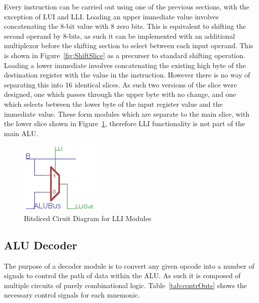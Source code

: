 Every instruction can be carried out using one of the previous sections, with the exception of LUI and LLI. Loading an upper immediate value involves concatenating the 8-bit value with 8 zero bits. 
This is equivalent to shifting the second operand by 8-bits, as such it can be implemented with an additional multiplexor before the shifting section to select between each input operand. 
This is shown in Figure~\ref{fig:ShiftSlice} as a precurser to standard shifting operation. 
Loading a lower immediate involves concatenating the existing high byte of the destination register with the value in the instruction. 
However there is no way of separating this into 16 identical slices. 
As such two versions of the slice were designed, one which passes through the upper byte with no change, and one which selects between the lower byte of the input register value and the immediate value. 
These form modules which are separate to the main slice, with the lower slice shown in  Figure~\ref{fig:LLISlice}, therefore LLI functionality is not part of the main ALU. 

\begin{figure}[h]
	\centering
	\includegraphics[width=1.5in]{Figures/LLILSlice.png}
	\caption{Bitsliced Ciruit Diagram for LLI Modules}
	\label{fig:LLISlice}
\end{figure}

\subsection{ALU Decoder}
The purpose of a decoder module is to convert any given opcode into a number of signals to control the path of data within the ALU. As such it is composed of multiple circuits of purely combinational logic. Table~\ref{tab:contrOuts} shows the necessary control signals for each mnemonic.


